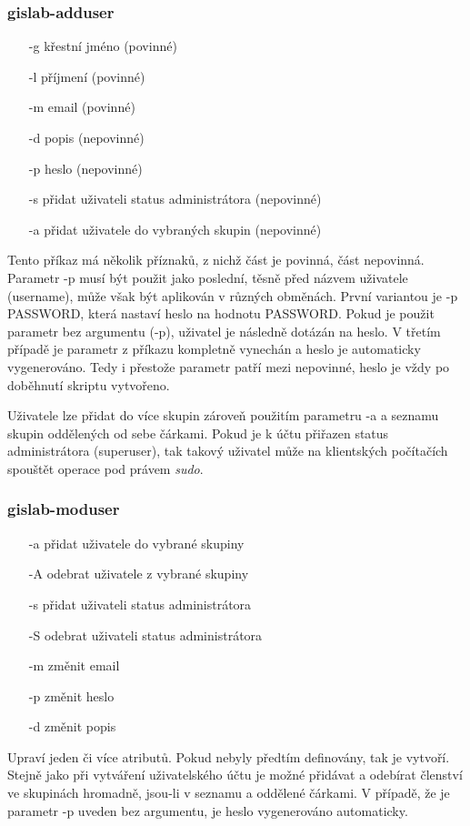 \subsubsection{gislab-adduser}
\begin{itemize}
\item [-g] křestní jméno (povinné)
\item [-l] příjmení (povinné)
\item [-m] email (povinné)
\item [-d] popis (nepovinné)
\item [-p] heslo (nepovinné)
\item [-s] přidat uživateli status administrátora (nepovinné)
\item [-a] přidat uživatele do vybraných skupin (nepovinné)
\end{itemize}
Tento příkaz má několik příznaků, z nichž část je povinná, část
nepovinná. Parametr \textsf{-p} musí být použit jako poslední, těsně
před názvem uživatele (username), může však být aplikován v různých
obměnách. První variantou je \textsf{-p PASSWORD}, která nastaví heslo
na hodnotu PASSWORD. Pokud je použit parametr bez argumentu
(\textsf{-p}), uživatel je následně dotázán na heslo. V třetím případě
je parametr z příkazu kompletně vynechán a heslo je automaticky
vygenerováno. Tedy i přestože parametr patří mezi nepovinné, heslo je
vždy po doběhnutí skriptu vytvořeno.

Uživatele lze přidat do více skupin zároveň použitím parametru
\textsf{-a} a seznamu skupin oddělených od sebe čárkami. Pokud je k
účtu přiřazen status administrátora (superuser), tak takový uživatel
může na klientských počítačích spouštět operace pod právem
\textit{sudo}.

\subsubsection{gislab-moduser}
\begin{itemize}
\item [-a] přidat uživatele do vybrané skupiny
\item [-A] odebrat uživatele z vybrané skupiny
\item [-s] přidat uživateli status administrátora
\item [-S] odebrat uživateli status administrátora
\item [-m] změnit email
\item [-p] změnit heslo
\item [-d] změnit popis
\end{itemize}
Upraví jeden či více atributů. Pokud nebyly předtím definovány, tak je
vytvoří. Stejně jako při vytváření uživatelského účtu je možné
přidávat a odebírat členství ve skupinách hromadně, jsou-li v seznamu
a oddělené čárkami. V případě, že je parametr \textsf{-p} uveden bez
argumentu, je heslo vygenerováno automaticky.

